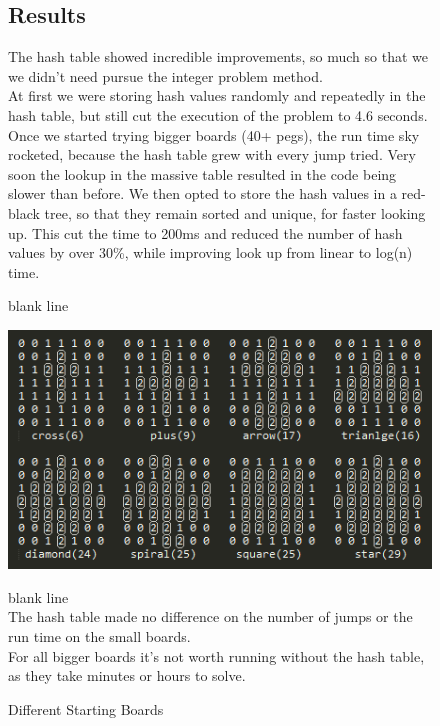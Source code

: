 \documentclass[11pt]{article}
\begin{document}
\begin{figure}
\subsection{Results}
The hash table showed incredible improvements, so much so that we we didn't need pursue the integer problem method.\\
At first we were storing hash values randomly and repeatedly in the hash table, but still cut the execution of the problem to 4.6 seconds. Once we started trying bigger boards (40+ pegs), the run time sky rocketed, because the hash table grew with every jump tried. Very soon the lookup in the massive table resulted in the code being slower than before.
We then opted to store the hash values in a red-black tree, so that they remain sorted and unique, for faster looking up.
This cut the time to 200ms and reduced the number of hash values by over 30\%, while improving look up from linear to log(n) time.\newline


\color{white} blank line\\
\color{black}
\begin{center}
\includegraphics[width=12cm]{5}
\end{center}
\caption{Different Starting Boards} 
\label{fig: 5}
\color{white} blank line\\
\color{black}
The hash table made no difference on the number of jumps or the run time on the small boards.\\
For all bigger boards it's not worth running without the hash table, as they take minutes or hours to solve.\\
\end{figure}
\newpage
\end{document}
